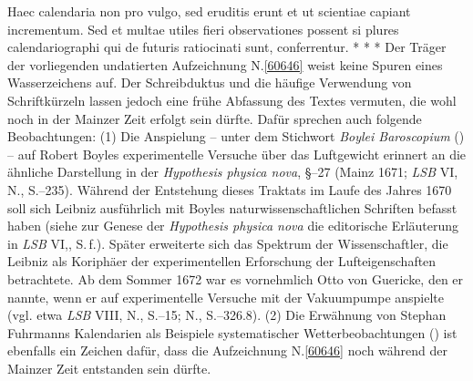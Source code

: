 Haec calendaria non pro vulgo,%
%
sed eruditis erunt%
et ut scientiae capiant incrementum.%
%
Sed et multae utiles fieri observationes possent%
si plures calendariographi%
qui de futuris ratiocinati sunt,%
conferrentur.
\pend%
\newpage%
\vspace{3.0em}%
\pstart%
\noindent%
\centering%
*     *     *
\pend%
\vspace{3.0em}%
%
\frenchspacing%
\footnotesize%
\pstart%
\noindent%
%
Der Träger der vorliegenden undatierten Aufzeichnung N.\;\ref{60646} weist keine Spuren eines Wasserzeichens auf.
Der Schreibduktus und die häufige Verwendung von Schriftkürzeln lassen jedoch eine frühe Abfassung des Textes vermuten, die wohl noch in der Mainzer Zeit erfolgt sein dürfte.
Dafür sprechen auch folgende Beobachtungen:
\pend%
\pstart%
(1) Die Anspielung -- unter dem Stichwort \textit{Boylei Baroscopium} () -- auf Robert Boyles experimentelle Versuche über das Luftgewicht erinnert an die ähnliche Darstellung in der \textit{Hypothesis physica nova}, §\;--27 (Mainz 1671; \textit{LSB} VI, N., S.--235).\cite{00256}
Während der Entstehung dieses Traktats im Laufe des Jahres 1670 soll sich Leibniz ausführlich mit Boyles naturwissenschaftlichen Schriften befasst haben (siehe zur Genese der \textit{Hypothesis physica nova} die editorische Erläuterung in \textit{LSB} VI,, S.\,f.).\cite{00256}
Später erweiterte sich das Spektrum der Wissenschaftler, die Leibniz als Koriphäer der experimentellen Erforschung der Lufteigenschaften betrachtete.
Ab dem Sommer 1672 war es vornehmlich Otto von Guericke, den er nannte, wenn er auf experimentelle Versuche mit der Vakuumpumpe anspielte (vgl. etwa \textit{LSB} VIII, N., S.--15;\cite{01069} N., S.--326.8).\cite{01265}
\pend%
\pstart%
(2) Die Erwähnung von Stephan Fuhrmanns Kalendarien als Beispiele systematischer Wetterbeobachtungen () ist ebenfalls ein Zeichen dafür, dass die Aufzeichnung N.\;\ref{60646} noch während der Mainzer Zeit entstanden sein dürfte.
